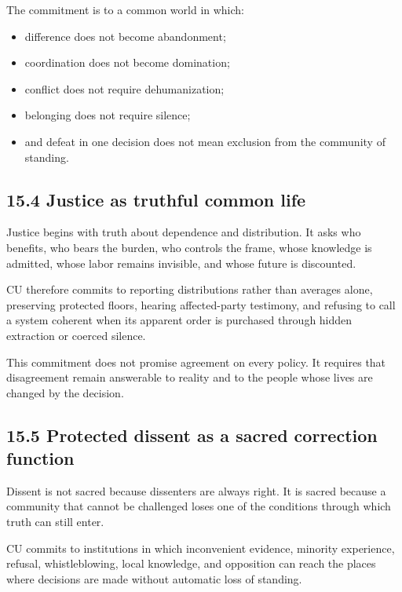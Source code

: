 \documentclass[
  11pt,
]{article}
\providecommand{\tightlist}{%
  \setlength{\itemsep}{0pt}\setlength{\parskip}{0pt}}
\begin{document}
The commitment is to a common world in which:

\begin{itemize}
\tightlist
\item
  difference does not become abandonment;
\item
  coordination does not become domination;
\item
  conflict does not require dehumanization;
\item
  belonging does not require silence;
\item
  and defeat in one decision does not mean exclusion from the community
  of standing.
\end{itemize}

\subsection{15.4 Justice as truthful common
life}\label{justice-as-truthful-common-life}

Justice begins with truth about dependence and distribution. It asks who
benefits, who bears the burden, who controls the frame, whose knowledge
is admitted, whose labor remains invisible, and whose future is
discounted.

CU therefore commits to reporting distributions rather than averages
alone, preserving protected floors, hearing affected-party testimony,
and refusing to call a system coherent when its apparent order is
purchased through hidden extraction or coerced silence.

This commitment does not promise agreement on every policy. It requires
that disagreement remain answerable to reality and to the people whose
lives are changed by the decision.

\subsection{15.5 Protected dissent as a sacred correction
function}\label{protected-dissent-as-a-sacred-correction-function}

Dissent is not sacred because dissenters are always right. It is sacred
because a community that cannot be challenged loses one of the
conditions through which truth can still enter.

CU commits to institutions in which inconvenient evidence, minority
experience, refusal, whistleblowing, local knowledge, and opposition can
reach the places where decisions are made without automatic loss of
standing.
\end{document}
